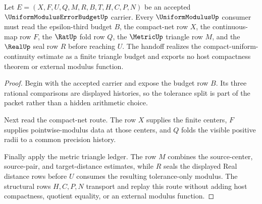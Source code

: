 \begin{theorem}
\label{thm:uniform-modulus-error-budget-triangle-route}
Let $E=(X,F,U,Q,M,R,B,T,H,C,P,N)$ be an accepted $\UniformModulusErrorBudgetUp$ carrier. Every $\UniformModulusUp$ consumer must read the epsilon-third budget $B$, the compact-net row $X$, the continuous-map row $F$, the $\RatUp$ fold row $Q$, the $\MetricUp$ triangle row $M$, and the $\RealUp$ seal row $R$ before reaching $U$. The handoff realizes the compact-uniform-continuity estimate as a finite triangle budget and exports no host compactness theorem or external modulus function.
\end{theorem}
\begin{proof}
Begin with the accepted carrier and expose the budget row $B$. Its three rational comparisons are displayed histories, so the tolerance split is part of the packet rather than a hidden arithmetic choice.

Next read the compact-net route. The row $X$ supplies the finite centers, $F$ supplies pointwise-modulus data at those centers, and $Q$ folds the visible positive radii to a common precision history.

Finally apply the metric triangle ledger. The row $M$ combines the source-center, source-pair, and target-distance estimates, while $R$ seals the displayed Real distance rows before $U$ consumes the resulting tolerance-only modulus. The structural rows $H,C,P,N$ transport and replay this route without adding host compactness, quotient equality, or an external modulus function.
\end{proof}




